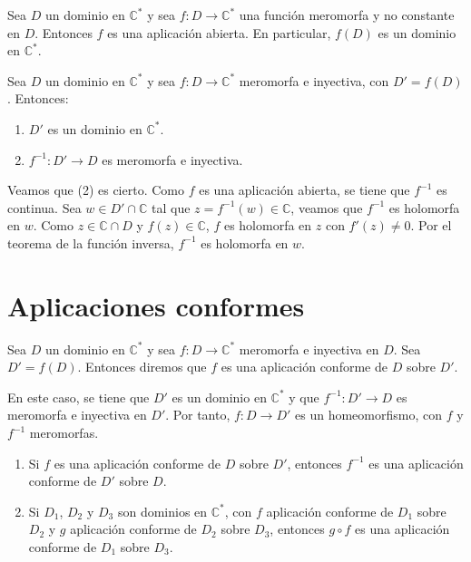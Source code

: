 \begin{theorem}
    Sea $D$ un dominio en $\mathbb{C}^\ast$ y sea $f: D \to \mathbb{C}^\ast$ una función meromorfa y no constante en $D$.
    Entonces $f$ es una aplicación abierta.
    En particular, $f(D)$ es un dominio en $\mathbb{C}^\ast$.
\end{theorem}

Sea $D$ un dominio en $\mathbb{C}^\ast$ y sea $f: D \to \mathbb{C}^\ast$ meromorfa e inyectiva, con $D' = f(D)$.
Entonces:
\begin{enumerate}
    \item $D'$ es un dominio en $\mathbb{C}^\ast$.
    \item $f^{-1}: D' \to D$ es meromorfa e inyectiva.
\end{enumerate}

Veamos que (2) es cierto.
Como $f$ es una aplicación abierta, se tiene que $f^{-1}$ es continua.
Sea $w \in D' \cap \mathbb{C}$ tal que $z = f^{-1}(w) \in \mathbb{C}$, veamos que $f^{-1}$ es holomorfa en $w$.
Como $z \in \mathbb{C} \cap D$ y $f(z) \in \mathbb{C}$, $f$ es holomorfa en $z$ con $f'(z) \neq 0$.
Por el teorema de la función inversa, $f^{-1}$ es holomorfa en $w$.

\section{Aplicaciones conformes}
\begin{definition}
    Sea $D$ un dominio en $\mathbb{C}^\ast$ y sea $f: D \to \mathbb{C}^\ast$ meromorfa e inyectiva en $D$.
    Sea $D' = f(D)$.
    Entonces diremos que $f$ es una aplicación conforme de $D$ sobre $D'$.
\end{definition}

En este caso, se tiene que $D'$ es un dominio en $\mathbb{C}^\ast$ y que $f^{-1}: D' \to D$ es meromorfa e inyectiva en $D'$.
Por tanto, $f: D \to D'$ es un homeomorfismo, con $f$ y $f^{-1}$ meromorfas.

\begin{remark}
    \hfill
    \begin{enumerate}
        \item Si $f$ es una aplicación conforme de $D$ sobre $D'$, entonces $f^{-1}$ es una aplicación conforme de $D'$ sobre $D$.
        \item Si $D_1$, $D_2$ y $D_3$ son dominios en $\mathbb{C}^\ast$, con $f$ aplicación conforme de $D_1$ sobre $D_2$ y $g$ aplicación conforme de $D_2$ sobre $D_3$, entonces $g \circ f$ es una aplicación conforme de $D_1$ sobre $D_3$.
    \end{enumerate}
\end{remark}

